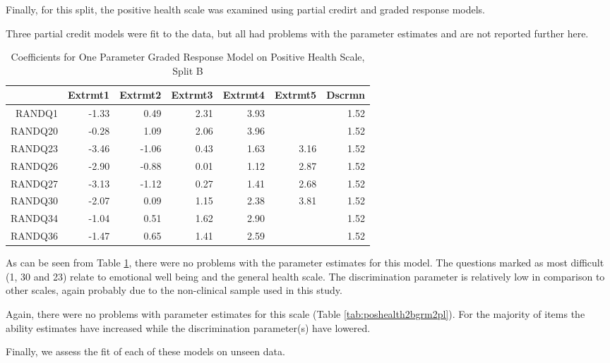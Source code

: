 \documentclass{article}
\begin{document}
Finally, for this split, the positive health scale was examined using partial credirt and graded response models. 


Three partial credit models were fit to the data, but all had problems with the parameter estimates and are not reported further here. 


\begin{table}[ht]
\centering
\begin{tabular}{rrrrrrr}
  \hline
 & Extrmt1 & Extrmt2 & Extrmt3 & Extrmt4 & Extrmt5 & Dscrmn \\ 
  \hline
RANDQ1 & -1.33 & 0.49 & 2.31 & 3.93 &  & 1.52 \\ 
  RANDQ20 & -0.28 & 1.09 & 2.06 & 3.96 &  & 1.52 \\ 
  RANDQ23 & -3.46 & -1.06 & 0.43 & 1.63 & 3.16 & 1.52 \\ 
  RANDQ26 & -2.90 & -0.88 & 0.01 & 1.12 & 2.87 & 1.52 \\ 
  RANDQ27 & -3.13 & -1.12 & 0.27 & 1.41 & 2.68 & 1.52 \\ 
  RANDQ30 & -2.07 & 0.09 & 1.15 & 2.38 & 3.81 & 1.52 \\ 
  RANDQ34 & -1.04 & 0.51 & 1.62 & 2.90 &  & 1.52 \\ 
  RANDQ36 & -1.47 & 0.65 & 1.41 & 2.59 &  & 1.52 \\ 
   \hline
\end{tabular}
\caption{Coefficients for One Parameter Graded Response Model on Positive Health Scale, Split B} 
\label{tab:poshealth2bgrm1pl}
\end{table}

As can be seen from Table \ref{tab:poshealth2bgrm1pl}, there were no problems with the parameter estimates for this model. The questions marked as most difficult (1, 30 and 23) relate to emotional well being and the general health scale. The discrimination parameter is relatively low in comparison to other scales, again probably due to the non-clinical sample used in this study. 


Again, there were no problems with parameter estimates for this scale (Table \ref{tab:poshealth2bgrm2pl}). For the majority of items the ability estimates have increased while the discrimination parameter(s) have lowered. 

Finally, we assess the fit of each of these models on unseen data. 
\end{document}
